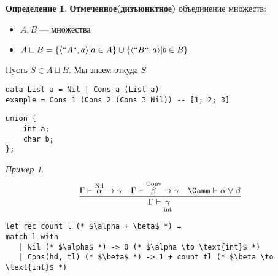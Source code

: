 \documentclass[english]{article}
\theoremstyle{plain}
\theoremstyle{remark}
\newtheorem*{examp}{Пример}
\theoremstyle{definition}
\newtheorem*{definition}{Определение}
\begin{document}
\begin{definition}
\textbf{Отмеченное(дизъюнктное)} объединение множеств: \\
\begin{itemize}
\item \(A, B\) --- множества
\item \(A \sqcup B = \{\langle ``A``, a \rangle| a\in A\}\cup\{\langle ``B``, a \rangle | b \in B\}\)
\end{itemize}
Пусть \(S \in A \sqcup B\). Мы знаем откуда \(S\)
\end{definition}
\begin{verbatim}
data List a = Nil | Cons a (List a)
example = Cons 1 (Cons 2 (Cons 3 Nil)) -- [1; 2; 3]
\end{verbatim}
\begin{verbatim}
union {
	int a;
	char b;
};
\end{verbatim}
\begin{examp}
\[
\frac{\Gamma \vdash \overset{\text{Nil}}{\alpha} \to \gamma\quad \Gamma \vdash \overset{\text{Cons}}{\beta} \to \gamma\quad \Gamm \vdash \alpha \vee \beta}{\Gamma \vdash \underset{\text{int}}{\gamma}}
\]
\begin{verbatim}
let rec count l (* $\alpha + \beta$ *) =
match l with
   | Nil (* $\alpha$ *) -> 0 (* $\alpha \to \text{int}$ *)
   | Cons(hd, tl) (* $\beta$ *) -> 1 + count tl (* $\beta \to \text{int}$ *)
\end{verbatim}
\end{examp}
\end{document}
